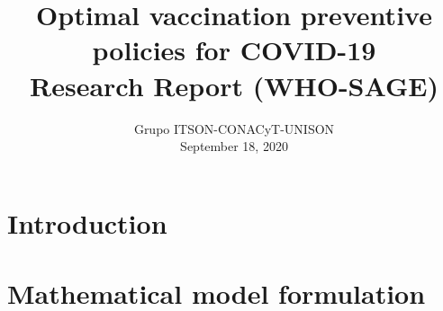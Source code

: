 \documentclass[preprint, sort&compress]{elsarticle}
\begin{document}
	\begin{frontmatter}
		\title{
			Optimal vaccination preventive policies for COVID-19\\
			\large{Research Report (WHO-SAGE)}
		}
		\author{%
	 	    Grupo ITSON-CONACyT-UNISON\\
	 	    September 18, 2020
		}%

	\end{frontmatter}

	\section{Introduction}
		
	\section{Mathematical model formulation}%
		
\end{document}
